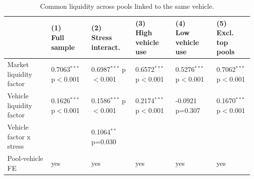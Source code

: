 \documentclass[12pt]{article}
\begin{document}
\begin{landscape}
\begin{table}[!htbp]
\centering
\scriptsize
\setlength{\tabcolsep}{2.5pt}
\begin{threeparttable}
\caption{Common liquidity across pools linked to the same vehicle.}
\label{tab:rq7-common-liquidity}
\begin{tabular}{@{}>{\raggedright\arraybackslash}p{}>{\raggedright\arraybackslash}p{}>{\raggedright\arraybackslash}p{}>{\raggedright\arraybackslash}p{}>{\raggedright\arraybackslash}p{}>{\raggedright\arraybackslash}p{}@{}}
\toprule
 & \makecell{(1) \\ Full \\ sample} & \makecell{(2) \\ Stress \\ interact.} & \makecell{(3) \\ High \\ vehicle use} & \makecell{(4) \\ Low \\ vehicle use} & \makecell{(5) \\ Excl. \\ top pools} \\
\midrule
Market liquidity factor & \makecell{0.7063$^{***}$ \\ {\scriptsize p$<$0.001}} & \makecell{0.6987$^{***}$ \\ {\scriptsize p$<$0.001}} & \makecell{0.6572$^{***}$ \\ {\scriptsize p$<$0.001}} & \makecell{0.5276$^{***}$ \\ {\scriptsize p$<$0.001}} & \makecell{0.7062$^{***}$ \\ {\scriptsize p$<$0.001}} \\
Vehicle liquidity factor & \makecell{0.1626$^{***}$ \\ {\scriptsize p$<$0.001}} & \makecell{0.1586$^{***}$ \\ {\scriptsize p$<$0.001}} & \makecell{0.2174$^{***}$ \\ {\scriptsize p$<$0.001}} & \makecell{-0.0921 \\ {\scriptsize p=0.307}} & \makecell{0.1670$^{***}$ \\ {\scriptsize p$<$0.001}} \\
Vehicle factor x stress &  & \makecell{0.1064$^{**}$ \\ {\scriptsize p=0.030}} &  &  &  \\
Pool-vehicle FE & yes & yes & yes & yes & yes \\

\end{tabular}
\end{threeparttable}
\end{table}
\end{landscape}
\end{document}
